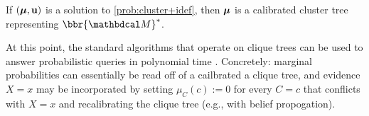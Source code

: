 \documentclass{article}
\newcommand\obslimit{observational facet} %
\begin{document}
\begin{prop} \label{prop:cluster+idef}
    If $(\boldsymbol\mu, \mathbf{u})$ is a solution to \eqref{prob:cluster+idef},
    then $\boldsymbol\mu$ is a calibrated cluster tree representing
    $\bbr{\dg M}^*$.
\end{prop}

At this point, the standard algorithms that operate on
clique trees
can be used to answer probabilistic queries in polynomial time \parencite[\S 10.3.3]{koller2009probabilistic}.
Concretely: marginal probabilities can essentially be read off of a cailbrated a clique tree,
and evidence $X{=}x$ may be incorporated by
setting $\mu_C(c) := 0$ for every $C{=}c$ that conflicts with $X{=}x$
and recalibrating the clique tree (e.g., with belief propogation).
%
\end{document}
